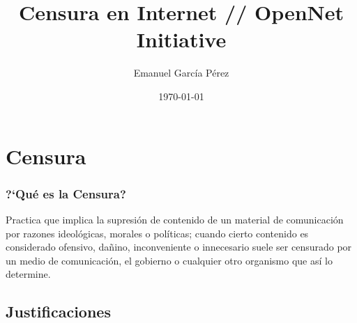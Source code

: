 \documentclass{beamer}
\title{\textbf{Censura en Internet // OpenNet Initiative}}
\author{Emanuel Garc\'ia P\'erez}
\date{\today}
\begin{document}
\frame[allowframebreaks]{\titlepage}
\section[Contenidos]{}
\frame{
\transdissolve[duration=0.2]
\tableofcontents
}


\section{Censura}
\frame
{
\transdissolve[duration=0.2]
\frametitle{?`Qu\'e es la Censura?}
Practica que implica la supresi\'on de contenido de un material de comunicaci\'on por razones ideol\'ogicas, morales o pol\'iticas; cuando cierto contenido es considerado ofensivo, da\~nino, inconveniente o innecesario suele ser censurado por un medio de comunicaci\'on, el gobierno o cualquier otro organismo que as\'i lo determine.
}

\subsection{Justificaciones}

\end{document}
